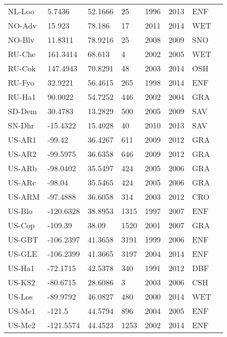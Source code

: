\documentclass[a4paper, 12pt]{article}
\begin{document}
\begin{longtable}{l l l l l l l l}
NL-Loo & 5.7436 & 52.1666 & 25 & 1996 & 2013 & ENF & \cite{NL-Loo} \\ 
NO-Adv & 15.923 & 78.186 & 17 & 2011 & 2014 & WET & \cite{NO-Adv} \\ 
NO-Blv & 11.8311 & 78.9216 & 25 & 2008 & 2009 & SNO & \cite{NO-Blv} \\ 
RU-Che & 161.3414 & 68.613 & 4 & 2002 & 2005 & WET & \cite{RU-Che} \\ 
RU-Cok & 147.4943 & 70.8291 & 48 & 2003 & 2014 & OSH & \cite{RU-Cok} \\ 
RU-Fyo & 32.9221 & 56.4615 & 265 & 1998 & 2014 & ENF & \cite{RU-Fyo} \\ 
RU-Ha1 & 90.0022 & 54.7252 & 446 & 2002 & 2004 & GRA & \cite{RU-Ha1} \\ 
SD-Dem & 30.4783 & 13.2829 & 500 & 2005 & 2009 & SAV & \cite{SD-Dem} \\ 
SN-Dhr & -15.4322 & 15.4028 & 40 & 2010 & 2013 & SAV & \cite{SN-Dhr} \\ 
US-AR1 & -99.42 & 36.4267 & 611 & 2009 & 2012 & GRA & \cite{US-AR1} \\ 
US-AR2 & -99.5975 & 36.6358 & 646 & 2009 & 2012 & GRA & \cite{US-AR2} \\ 
US-ARb & -98.0402 & 35.5497 & 424 & 2005 & 2006 & GRA & \cite{US-ARb} \\ 
US-ARc & -98.04 & 35.5465 & 424 & 2005 & 2006 & GRA & \cite{US-ARc} \\ 
US-ARM & -97.4888 & 36.6058 & 314 & 2003 & 2012 & CRO & \cite{US-ARM} \\ 
US-Blo & -120.6328 & 38.8953 & 1315 & 1997 & 2007 & ENF & \cite{US-Blo} \\ 
US-Cop & -109.39 & 38.09 & 1520 & 2001 & 2007 & GRA & \cite{US-Cop} \\ 
US-GBT & -106.2397 & 41.3658 & 3191 & 1999 & 2006 & ENF & \cite{US-GBT} \\ 
US-GLE & -106.2399 & 41.3665 & 3197 & 2004 & 2014 & ENF & \cite{US-GLE} \\ 
US-Ha1 & -72.1715 & 42.5378 & 340 & 1991 & 2012 & DBF & \cite{US-Ha1} \\ 
US-KS2 & -80.6715 & 28.6086 & 3 & 2003 & 2006 & CSH & \cite{US-KS2} \\ 
US-Los & -89.9792 & 46.0827 & 480 & 2000 & 2014 & WET & \cite{US-Los} \\ 
US-Me1 & -121.5 & 44.5794 & 896 & 2004 & 2005 & ENF & \cite{US-Me1} \\ 
US-Me2 & -121.5574 & 44.4523 & 1253 & 2002 & 2014 & ENF & \cite{US-Me2} \\ 

\end{longtable}
\end{document}
